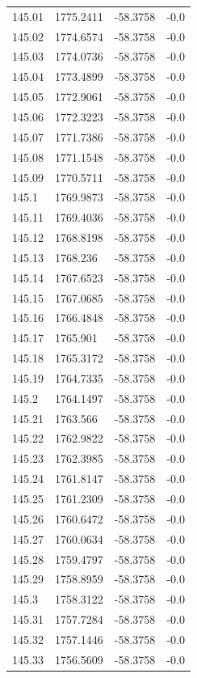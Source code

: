 \begin{table}[H]
\begin{tabular}{llll}
145.01 & 1775.2411 & -58.3758 & -0.0 \\
145.02 & 1774.6574 & -58.3758 & -0.0 \\
145.03 & 1774.0736 & -58.3758 & -0.0 \\
145.04 & 1773.4899 & -58.3758 & -0.0 \\
145.05 & 1772.9061 & -58.3758 & -0.0 \\
145.06 & 1772.3223 & -58.3758 & -0.0 \\
145.07 & 1771.7386 & -58.3758 & -0.0 \\
145.08 & 1771.1548 & -58.3758 & -0.0 \\
145.09 & 1770.5711 & -58.3758 & -0.0 \\
145.1 & 1769.9873 & -58.3758 & -0.0 \\
145.11 & 1769.4036 & -58.3758 & -0.0 \\
145.12 & 1768.8198 & -58.3758 & -0.0 \\
145.13 & 1768.236 & -58.3758 & -0.0 \\
145.14 & 1767.6523 & -58.3758 & -0.0 \\
145.15 & 1767.0685 & -58.3758 & -0.0 \\
145.16 & 1766.4848 & -58.3758 & -0.0 \\
145.17 & 1765.901 & -58.3758 & -0.0 \\
145.18 & 1765.3172 & -58.3758 & -0.0 \\
145.19 & 1764.7335 & -58.3758 & -0.0 \\
145.2 & 1764.1497 & -58.3758 & -0.0 \\
145.21 & 1763.566 & -58.3758 & -0.0 \\
145.22 & 1762.9822 & -58.3758 & -0.0 \\
145.23 & 1762.3985 & -58.3758 & -0.0 \\
145.24 & 1761.8147 & -58.3758 & -0.0 \\
145.25 & 1761.2309 & -58.3758 & -0.0 \\
145.26 & 1760.6472 & -58.3758 & -0.0 \\
145.27 & 1760.0634 & -58.3758 & -0.0 \\
145.28 & 1759.4797 & -58.3758 & -0.0 \\
145.29 & 1758.8959 & -58.3758 & -0.0 \\
145.3 & 1758.3122 & -58.3758 & -0.0 \\
145.31 & 1757.7284 & -58.3758 & -0.0 \\
145.32 & 1757.1446 & -58.3758 & -0.0 \\
145.33 & 1756.5609 & -58.3758 & -0.0 \\

\end{tabular}
\end{table}
